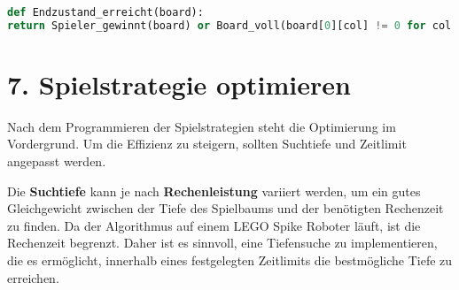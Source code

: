\begin{lstlisting}[language=Python, caption=Erkennung des Endzustands]
def Endzustand_erreicht(board):
return Spieler_gewinnt(board) or Board_voll(board[0][col] != 0 for col in range(7))
\end{lstlisting}

\section*{7. Spielstrategie optimieren}

Nach dem Programmieren der Spielstrategien steht die Optimierung im Vordergrund. Um die Effizienz zu steigern, sollten Suchtiefe und Zeitlimit angepasst werden.

Die \textbf{Suchtiefe} kann je nach \textbf{Rechenleistung} variiert werden, um ein gutes Gleichgewicht zwischen der Tiefe des Spielbaums und der benötigten Rechenzeit zu finden. Da der Algorithmus auf einem LEGO Spike Roboter läuft, ist die Rechenzeit begrenzt. Daher ist es sinnvoll, eine Tiefensuche zu implementieren, die es ermöglicht, innerhalb eines festgelegten Zeitlimits die bestmögliche Tiefe zu erreichen. 







